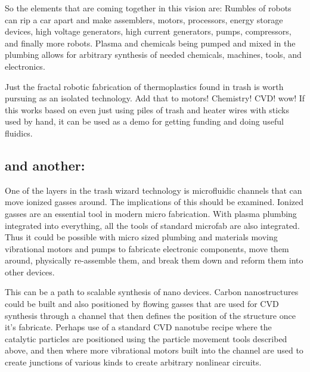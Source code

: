 So the elements that are coming together in this vision are: Rumbles of
robots can rip a car apart and make assemblers, motors, processors,
energy storage devices, high voltage generators, high current
generators, pumps, compressors, and finally more robots. Plasma and
chemicals being pumped and mixed in the plumbing allows for arbitrary
synthesis of needed chemicals, machines, tools, and electronics.

Just the fractal robotic fabrication of thermoplastics found in trash is
worth pursuing as an isolated technology. Add that to motors! Chemistry!
CVD! wow! If this works based on even just using piles of trash and
heater wires with sticks used by hand, it can be used as a demo for
getting funding and doing useful fluidics.

\subsection{and another:}\label{and-another}

One of the layers in the trash wizard technology is microfluidic
channels that can move ionized gasses around. The implications of this
should be examined. Ionized gasses are an essential tool in modern micro
fabrication. With plasma plumbing integrated into everything, all the
tools of standard microfab are also integrated. Thus it could be
possible with micro sized plumbing and materials moving vibrational
motors and pumps to fabricate electronic components, move them around,
physically re-assemble them, and break them down and reform them into
other devices.

This can be a path to scalable synthesis of nano devices. Carbon
nanostructures could be built and also positioned by flowing gasses that
are used for CVD synthesis through a channel that then defines the
position of the structure once it's fabricate. Perhaps use of a standard
CVD nanotube recipe where the catalytic particles are positioned using
the particle movement tools described above, and then where more
vibrational motors built into the channel are used to create junctions
of various kinds to create arbitrary nonlinear circuits.

